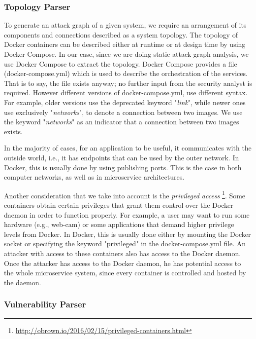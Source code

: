\subsubsection{Topology Parser}
\label{chap:topology_p}

To generate an attack graph of a given system, we require an arrangement of its components and connections described as a system topology. The topology of Docker containers can be described either at  runtime or at design time by using Docker Compose. In our case, since we are doing static attack graph analysis, we use Docker Compose to extract the topology. Docker Compose provides a  file (docker-compose.yml) which is used to describe the orchestration of the services. That is to say, the file exists anyway; no further input from the security analyst is required. However different versions of docker-compose.yml, use different syntax. For example, older versions use the deprecated keyword "\textit{link}", while newer ones use exclusively "\textit{networks}", to denote a connection between two images. We use the keyword "\textit{networks}" as an indicator that a connection between two images exists.

In the majority of cases, for an application to be useful, it communicates with the outside world, i.e., it has endpoints that can be used by the outer network. In Docker, this is usually done by using publishing ports. This is the case in both computer networks, as well as in microservice architectures.

Another consideration that we take into account is the \textit{privileged access} \footnote{\url{http://obrown.io/2016/02/15/privileged-containers.html}}. Some containers obtain certain privileges that grant them control over the Docker daemon in order to function properly. For example, a user may want to run some hardware (e.g., web-cam) or some applications that demand higher privilege levels  from Docker. In Docker, this is usually done either by mounting the Docker socket or specifying the keyword "privileged" in the docker-compose.yml file. An attacker with access to these containers  also has  access to the Docker daemon. Once the attacker has access to the Docker daemon, he has potential access to the whole microservice system, since every container is controlled and hosted by the daemon.




\subsubsection{Vulnerability Parser}
\label{chap:vulnerability_p}

